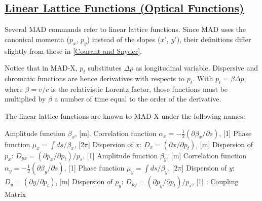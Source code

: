 \subsection{\href{linear}{Linear Lattice Functions (Optical Functions)}} 
\label{subsec:tables_linear}
Several MAD commands refer to linear lattice functions. Since MAD uses
the canonical momenta ($p_x$, $p_y$) instead of the slopes ($x'$, 
$y'$), their definitions differ slightly from those in
\href{bibliography.html#courant}{[Courant and Snyder]}.

Notice that in MAD-X, $p_t$ substitutes $\Delta p$ as longitudinal
variable. 
Dispersive and chromatic functions are hence derivatives with
respects to $p_t$. With $p_t = \beta \Delta p$, where $\beta = v/c$ is the relativistic
Lorentz factor, those functions must be multiplied by $\beta$ a number of
time equal to the order of the derivative. 

The linear lattice functions are known to MAD-X under the following names:
\begin{madlist}
   Amplitude function $\beta_x$, [m].   
   Correlation function 
  $\alpha_x = - \frac{1}{2} (\partial \beta_x / \partial s)$, [1]   
   Phase function $\mu_x = \int ds / \beta_x$, [$2 \pi$]
   Dispersion of $x$: $D_x = (\partial x / \partial p_t)$, [m] 
   Dispersion of $p_x$: $D_{px} = (\partial p_x / \partial p_t) / p_s$, [1] 
   Amplitude function $\beta_y$, [m]   
   Correlation function 
  $\alpha_y = - \frac{1}{2} ( \partial \beta_y / \partial s)$, [1] 
   Phase function $\mu_y = \int ds / \beta_y$, [$2 \pi$]
   Dispersion of $y$: $D_y = (\partial y / \partial p_t)$, [m] 
   Dispersion of $p_y$: $D_{py} = ( \partial p_y / \partial p_t) / p_s$, [1] 
   : Coupling Matrix     
\end{madlist}



